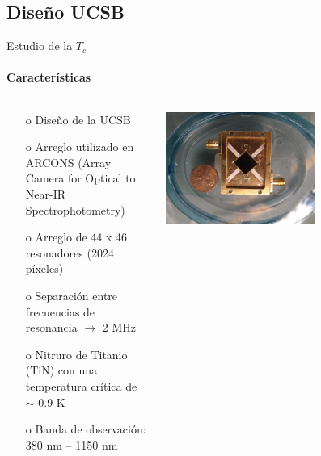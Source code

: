 \documentclass[ignorenonframetext,12pt]{beamer}
\begin{document}
\subsection{Diseño UCSB}
\begin{frame}{Estudio de la $T_c$}
				\framesubtitle{Características}
				\begin{columns}
								\begin{column}{0.49\textwidth}
												\begin{itemize}
																\item[o] Diseño de la UCSB
																\item[o] Arreglo utilizado en ARCONS (Array
																				Camera for Optical to Near-IR
																				Spectrophotometry)
																\item[o] Arreglo de 44 x 46 resonadores (\alert{2024
																				píxeles})
																\item[o] Separación entre frecuencias de
																				resonancia $\to$ \alert{2 MHz}
																\item[o] Nitruro de Titanio (TiN) con una temperatura
																				crítica de \alert{$\sim$ 0.9 K}
																\item[o] Banda de observación: \alert{380 nm --
																				1150 nm}
												\end{itemize}
								\end{column}
								\begin{column}{0.49\textwidth}
												\centering
												\includegraphics[width=0.6\textwidth]{mkid4}

\end{column}
\end{columns}
\end{frame}
\end{document}
